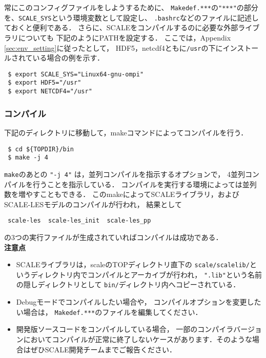 常にこのコンフィグファイルをしようするために、
\verb|Makedef.***|の\verb|"***"|の部分を、\verb|SCALE_SYS|という環境変数として設定し、
\verb|.bashrc|などのファイルに記述しておくと便利である．
さらに、SCALEをコンパイルするのに必要な外部ライブラリについても
下記のようにPATHを設定する．
ここでは，Appendix \ref{sec:env_setting}に従ったとして，
HDF5，netcdf4ともに\verb|/usr|の下にインストールされている場合の例を示す．

\begin{verbatim}
 $ export SCALE_SYS="Linux64-gnu-ompi"
 $ export HDF5="/usr"
 $ export NETCDF4="/usr"
\end{verbatim}


\subsubsection{コンパイル}

下記のディレクトリに移動して，makeコマンドによってコンパイルを行う．
\begin{verbatim}
 $ cd ${TOPDIR}/bin
 $ make -j 4
\end{verbatim}
\verb|make|のあとの \verb|"-j 4"| は，並列コンパイルを指示するオプションで，
4並列コンパイルを行うことを指示している．
コンパイルを実行する環境によっては並列数を増やすこともできる．
このmakeによってSCALEライブラリ，およびSCALE-LESモデルのコンパイルが行われ，
結果として
\begin{verbatim}
 scale-les  scale-les_init  scale-les_pp
\end{verbatim}
の3つの実行ファイルが生成されていればコンパイルは成功である．\\


{\bf 注意点}
\begin{itemize}
\item SCALEライブラリは，scaleのTOPディレクトリ直下の
 \verb|scale/scalelib/|というディレクトリ内でコンパイルとアーカイブが行われ，
 \verb|".lib"|という名前の隠しディレクトリとして
 \verb|bin/|ディレクトリ内へコピーされている．
\item Debugモードでコンパイルしたい場合や，
 コンパイルオプションを変更したい場合は，
 \verb|Makedef.***|のファイルを編集してください．
\item 開発版ソースコードをコンパイルしている場合，
 一部のコンパイラバージョンにおいてコンパイルが正常に終了しないケースがあります．そのような場合はぜひSCALE開発チームまでご報告ください．
\end{itemize}



